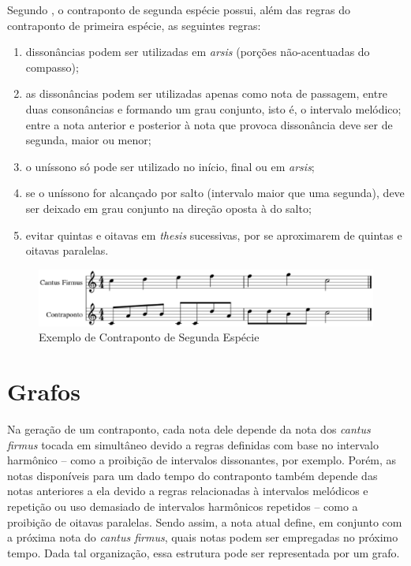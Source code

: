         Segundo , o contraponto de segunda espécie possui, além das regras do contraponto de primeira espécie, as seguintes regras:

        \begin{enumerate}
          \item dissonâncias podem ser utilizadas em \textit{arsis} (porções não-acentuadas do compasso);
          \item as dissonâncias podem ser utilizadas apenas como nota de passagem, entre duas consonâncias e formando um grau conjunto, isto é, o intervalo melódico; entre a nota anterior e posterior à nota que provoca dissonância deve ser de segunda, maior ou menor;
          \item o uníssono só pode ser utilizado no início, final ou em \textit{arsis};
          \item se o uníssono for alcançado por salto (intervalo maior que uma segunda), deve ser deixado em grau conjunto na direção oposta à do salto;
          \item evitar quintas e oitavas em \textit{thesis} sucessivas, por se aproximarem de quintas e oitavas paralelas.
        \end{enumerate}

        \begin{figure}[htb]
          \centering
          \includegraphics[scale=0.55]{figuras/contrapontosegunda.eps}
          \caption{Exemplo de Contraponto de Segunda Espécie}
          \label{contrapontosegunda}
        \end{figure}

  \section[Grafos]{Grafos}

    Na geração de um contraponto, cada nota dele depende da nota dos \textit{cantus firmus} tocada em simultâneo devido a regras definidas com base no intervalo harmônico -- como a proibição de intervalos dissonantes, por exemplo. Porém, as notas disponíveis para um dado tempo do contraponto também depende das notas anteriores a ela devido a regras relacionadas à intervalos melódicos e repetição ou uso demasiado de intervalos harmônicos repetidos -- como a proibição de oitavas paralelas. Sendo assim, a nota atual define, em conjunto com a próxima nota do \textit{cantus firmus}, quais notas podem ser empregadas no próximo tempo. Dada tal organização, essa estrutura pode ser representada por um grafo.

